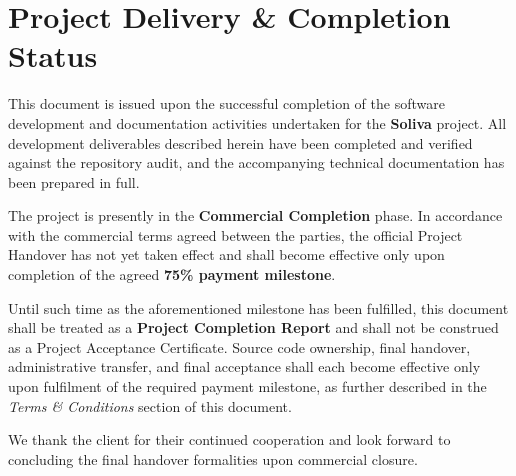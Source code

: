 \documentclass[11pt,a4paper]{article}
\newcommand{\ProjectName}{Soliva}
\begin{document}
\section*{Project Delivery \& Completion Status}

This document is issued upon the successful completion of the software
development and documentation activities undertaken for the
\textbf{\ProjectName} project. All development deliverables described herein
have been completed and verified against the repository audit, and the
accompanying technical documentation has been prepared in full.

The project is presently in the \textbf{Commercial Completion} phase. In
accordance with the commercial terms agreed between the parties, the official
Project Handover has not yet taken effect and shall become effective only
upon completion of the agreed \textbf{75\% payment milestone}.

Until such time as the aforementioned milestone has been fulfilled, this
document shall be treated as a \textbf{Project Completion Report} and shall
not be construed as a Project Acceptance Certificate. Source code ownership,
final handover, administrative transfer, and final acceptance shall each
become effective only upon fulfilment of the required payment milestone, as
further described in the \emph{Terms \& Conditions} section of this document.

We thank the client for their continued cooperation and look forward to
concluding the final handover formalities upon commercial closure.

\vspace{0.8cm}

\begin{center}
\end{center}
\end{document}
